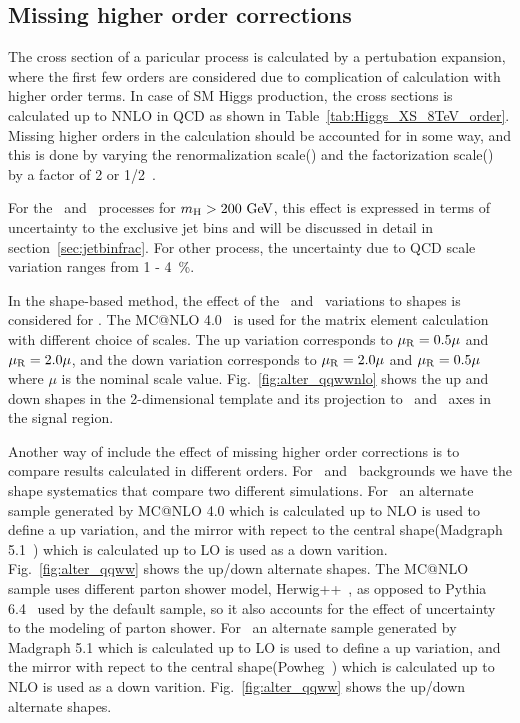 \subsection{Missing higher order corrections} 

The cross section of a paricular process is calculated by a pertubation expansion, 
where the first few orders are considered due to complication of calculation 
with higher order terms. In case of SM Higgs production, the cross sections is calculated 
up to NNLO in QCD as shown in Table~\ref{tab:Higgs_XS_8TeV_order}. Missing higher orders 
in the calculation should be accounted for in some way, and this is done by 
varying the renormalization scale(\mR) and the factorization scale(\mF) 
by a factor of 2 or 1/2~\cite{Dittmaier:1318996}. 

For the \ggH\ and \qqww\ processes for $m_{\mathrm{H}}>200~\mathrm{Ge\kern -0.1em V}$, 
this effect is expressed in terms of uncertainty to the 
exclusive jet bins and will be discussed in detail in section~\ref{sec:jetbinfrac}. 
For other process, the uncertainty due to QCD scale variation ranges from 1 - 4~\%.   

In the shape-based method, the effect of the \mR\ and \mF\ variations to shapes 
is considered for \qqww. The MC@NLO 4.0~\cite{Frixione:2002ik} is used for the matrix element calculation 
with different choice of scales. The up variation corresponds to $\mu_\mathrm{R}=0.5\mu$ and $\mu_\mathrm{R}=2.0\mu$,
and the down variation corresponds to $\mu_\mathrm{R}=2.0\mu$ and $\mu_\mathrm{R}=0.5\mu$ where $\mu$ is the nominal 
scale value. Fig.~\ref{fig:alter_qqwwnlo} shows the up and down  
shapes in the 2-dimensional template and its projection to \mT\ and \mll\ axes
in the signal region.

Another way of include the effect of missing higher order corrections 
is to compare results calculated in different orders. For \qqww\ and \topbkg\ 
backgrounds we have the shape systematics that compare two different simulations. 
For \qqww\ an alternate sample generated by MC@NLO 4.0 which is calculated up to NLO
is used to define a up variation, 
and the mirror with repect to the central shape(Madgraph 5.1~\cite{Madgraph5p1}) which is calculated up to LO 
is used as a down varition.
Fig.~\ref{fig:alter_qqww} shows the up/down alternate shapes. 
The MC@NLO sample uses different parton shower model, Herwig++~\cite{Corcella:2000bw}, 
as opposed to 
Pythia 6.4~\cite{Sjostrand:2006za} used by the default sample, 
so it also accounts for the effect of uncertainty 
to the modeling of parton shower. 
For \topbkg\ an alternate sample generated by Madgraph 5.1 which is calculated up to LO
is used to define a up variation,
and the mirror with repect to the central shape(Powheg~\cite{Frixione:2007vw}) which is calculated up to NLO 
is used as a down varition.
Fig.~\ref{fig:alter_qqww} shows the up/down alternate shapes. 


